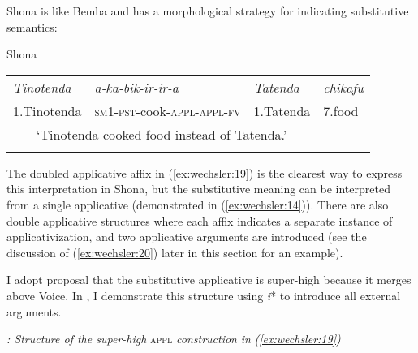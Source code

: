 \documentclass[output=paper]{langscibook}
\begin{document}
Shona is like Bemba and has a morphological strategy for indicating substitutive semantics: 


\ea\label{ex:wechsler:19}
Shona\\

\tablefirsthead{}

\tabletail{}
\tablelasttail{}
\begin{tabularx}{\textwidth}{XXXX}
\lsptoprule
{\itshape Tinotenda}  & \textit{a-ka-bik-ir-ir-a}                                  & \textit{Tatenda} & {\itshape chikafu}\\
1.Tinotenda & \textsc{sm1-pst}{}-cook-\textsc{appl-appl-fv} & 1.Tatenda & 7.food\\
\multicolumn{3}{c}{‘Tinotenda cooked food instead of Tatenda.’}  & \\
\lspbottomrule
\end{tabularx}
\z

The doubled applicative affix in (\ref{ex:wechsler:19}) is the clearest way to express this interpretation in Shona,\textstyleFootnoteSymbol{} but the substitutive meaning can be interpreted from a single applicative (demonstrated in (\ref{ex:wechsler:14})). There are also double applicative structures where each affix indicates a separate instance of applicativization, and two applicative arguments are introduced (see the discussion of (\ref{ex:wechsler:20}) later in this section for an example). 



I adopt  proposal that the substitutive applicative is super-high because it merges above Voice. In , I demonstrate this structure using \textit{i}* to introduce all external arguments.  



  
 



\textit{: Structure of the super-high} \textsc{appl} \textit{construction} \textit{in} \textit{(\ref{ex:wechsler:19})}
\end{document}
